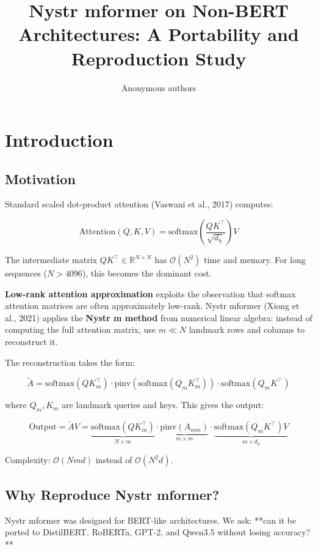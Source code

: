 \title{\textbf{Nystr mformer on Non-BERT Architectures: A Portability and Reproduction Study}}

\author{Anonymous authors}



\section{Introduction}

\subsection{Motivation}

Standard scaled dot-product attention (Vaswani et al., 2017) computes:

\[
\mathrm{Attention}(Q, K, V) = \mathrm{softmax}\!\left(\frac{Q K^\top}{\sqrt{d_h}}\right) V
\tag{1.1}
\]

The intermediate matrix $Q K^\top \in \mathbb{R}^{N \times N}$ has 
$\mathcal{O}(N^2)$ time and memory. For long sequences ($N > 4096$), this 
becomes the dominant cost.

\textbf{Low-rank attention approximation} exploits the observation that softmax 
attention matrices are often approximately low-rank. Nystr mformer (Xiong 
et al., 2021) applies the \textbf{Nystr m method} from numerical linear algebra: 
instead of computing the full attention matrix, use $m \ll N$ landmark 
rows and columns to reconstruct it.

The reconstruction takes the form:

\[
\tilde{A} = \text{softmax}(Q K_m^\top) \cdot \text{pinv}(\text{softmax}(Q_m K_m^\top)) \cdot \text{softmax}(Q_m K^\top)
\tag{1.2}
\]

where $Q_m, K_m$ are landmark queries and keys. This gives the output:

\[
\text{Output} = \tilde{A} V = \underbrace{\text{softmax}(Q K_m^\top)}_{N \times m} \cdot \underbrace{\text{pinv}(A_{mm})}_{m \times m} \cdot \underbrace{\text{softmax}(Q_m K^\top) V}_{m \times d_h}
\tag{1.3}
\]

Complexity: $\mathcal{O}(N m d)$ instead of $\mathcal{O}(N^2 d)$.

\subsection{Why Reproduce Nystr mformer?}

Nystr mformer was designed for BERT-like architectures. We ask: **can it 
be ported to DistilBERT, RoBERTa, GPT-2, and Qwen3.5 without losing 
accuracy?**

